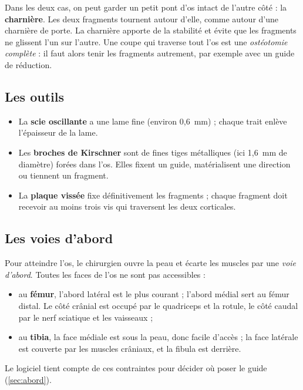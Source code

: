 
Dans les deux cas, on peut garder un petit pont d'os intact de l'autre côté : la \textbf{charnière}. Les deux
fragments tournent autour d'elle, comme autour d'une charnière de porte. La charnière apporte de la stabilité et
évite que les fragments ne glissent l'un sur l'autre. Une coupe qui traverse tout l'os est une \emph{ostéotomie
complète} : il faut alors tenir les fragments autrement, par exemple avec un guide de réduction.

\subsection{Les outils}

\begin{itemize}
  \item La \textbf{scie oscillante} a une lame fine (environ 0,6~mm) ; chaque trait enlève l'épaisseur de la lame.
  \item Les \textbf{broches de Kirschner} sont de fines tiges métalliques (ici 1,6~mm de diamètre) forées dans l'os.
  Elles fixent un guide, matérialisent une direction ou tiennent un fragment.
  \item La \textbf{plaque vissée} fixe définitivement les fragments ; chaque fragment doit recevoir au moins trois vis
  qui traversent les deux corticales.
\end{itemize}

\subsection{Les voies d'abord}

Pour atteindre l'os, le chirurgien ouvre la peau et écarte les muscles par une \emph{voie d'abord}. Toutes les faces
de l'os ne sont pas accessibles :
\begin{itemize}
  \item au \textbf{fémur}, l'abord latéral est le plus courant ; l'abord médial sert au fémur distal. Le côté crânial
  est occupé par le quadriceps et la rotule, le côté caudal par le nerf sciatique et les vaisseaux ;
  \item au \textbf{tibia}, la face médiale est sous la peau, donc facile d'accès ; la face latérale est couverte par
  les muscles crâniaux, et la fibula est derrière.
\end{itemize}
Le logiciel tient compte de ces contraintes pour décider où poser le guide (\cref{sec:abord}).

